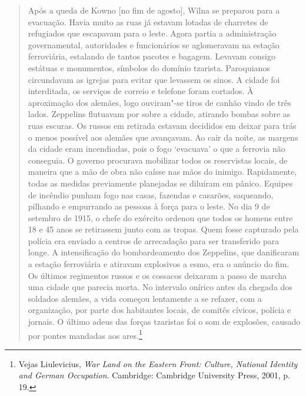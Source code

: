 \begin{quote}
Após a queda de Kowno {[}no fim de agosto{]}, Wilna se preparou para a
evacuação. Havia muito as ruas já estavam lotadas de charretes de
refugiados que escapavam para o leste. Agora partia a administração
governamental, autoridades e funcionários se aglomeravam na estação
ferroviária, estalando de tantos pacotes e bagagem. Levavam consigo
estátuas e monumentos, símbolos do domínio tzarista. Paroquianos
circundavam as igrejas para evitar que levassem os sinos. A cidade foi
interditada, os serviços de correio e telefone foram cortados. À
aproximação dos alemães, logo ouviram"-se tiros de canhão vindo de três
lados. Zeppelins flutuavam por sobre a cidade, atirando bombas sobre as
ruas escuras. Os russos em retirada estavam decididos em deixar para
trás o menos possível aos alemães que avançavam. Ao cair da noite, as
margens da cidade eram incendiadas, pois o fogo `evacuava' o que a
ferrovia não conseguia. O governo procurava mobilizar todos os
reservistas locais, de maneira que a mão de obra não caísse nas mãos do
inimigo. Rapidamente, todas as medidas previamente planejadas se
diluíram em pânico. Equipes de incêndio punham fogo nas casas, fazendas
e casarões, saqueando, pilhando e empurrando as pessoas à força para o
leste. No dia 9 de setembro de 1915, o chefe do exército ordenou que
todos os homens entre 18 e 45 anos se retirassem junto com as tropas.
Quem fosse capturado pela polícia era enviado a centros de arrecadação
para ser transferido para longe. A intensificação do bombardeamento dos
Zeppelins, que danificaram a estação ferroviária e atiravam explosivos a
esmo, era o anúncio do fim. Os últimos regimentos russos e os cossacos
deixaram a passo de marcha uma cidade que parecia morta. No intervalo
onírico antes da chegada dos soldados alemães, a vida começou lentamente
a se refazer, com a organização, por parte dos habitantes locais, de
comitês cívicos, polícia e jornais. O último adeus das forças tzaristas
foi o som de explosões, causado por pontes mandadas aos ares.\footnote{Vejas
  Liulevicius, \emph{War Land on the Eastern Front: Culture, National
  Identity and German Occupation}. Cambridge: Cambridge University
  Press, 2001, p. 19.}
\end{quote}

%

